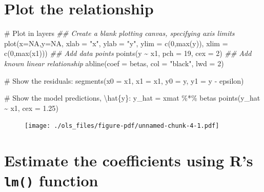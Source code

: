 \documentclass[
  letterpaper,
  DIV=11,
  numbers=noendperiod]{scrreprt}
\newenvironment{Shaded}{\begin{snugshade}}{\end{snugshade}}
\newcommand{\AttributeTok}[1]{\textcolor[rgb]{0.40,0.45,0.13}{#1}}
\newcommand{\CommentTok}[1]{\textcolor[rgb]{0.37,0.37,0.37}{#1}}
\newcommand{\ConstantTok}[1]{\textcolor[rgb]{0.56,0.35,0.01}{#1}}
\newcommand{\DecValTok}[1]{\textcolor[rgb]{0.68,0.00,0.00}{#1}}
\newcommand{\DocumentationTok}[1]{\textcolor[rgb]{0.37,0.37,0.37}{\textit{#1}}}
\newcommand{\FloatTok}[1]{\textcolor[rgb]{0.68,0.00,0.00}{#1}}
\newcommand{\FunctionTok}[1]{\textcolor[rgb]{0.28,0.35,0.67}{#1}}
\newcommand{\NormalTok}[1]{\textcolor[rgb]{0.00,0.23,0.31}{#1}}
\newcommand{\OtherTok}[1]{\textcolor[rgb]{0.00,0.23,0.31}{#1}}
\newcommand{\SpecialCharTok}[1]{\textcolor[rgb]{0.37,0.37,0.37}{#1}}
\newcommand{\StringTok}[1]{\textcolor[rgb]{0.13,0.47,0.30}{#1}}
\begin{document}
\hypertarget{plot-the-relationship}{%
\section{Plot the relationship}\label{plot-the-relationship}}

\begin{Shaded}
\begin{Highlighting}[]
\CommentTok{\# Plot in layers}
\DocumentationTok{\#\# Create a blank plotting canvas, specifying axis limits}
\FunctionTok{plot}\NormalTok{(}\AttributeTok{x=}\ConstantTok{NA}\NormalTok{,}\AttributeTok{y=}\ConstantTok{NA}\NormalTok{, }\AttributeTok{xlab =} \StringTok{"x"}\NormalTok{, }\AttributeTok{ylab =} \StringTok{"y"}\NormalTok{,}
     \AttributeTok{ylim =} \FunctionTok{c}\NormalTok{(}\DecValTok{0}\NormalTok{,}\FunctionTok{max}\NormalTok{(y)), }\AttributeTok{xlim =} \FunctionTok{c}\NormalTok{(}\DecValTok{0}\NormalTok{,}\FunctionTok{max}\NormalTok{(x1)))}
\DocumentationTok{\#\# Add data points}
\FunctionTok{points}\NormalTok{(y }\SpecialCharTok{\textasciitilde{}}\NormalTok{ x1, }\AttributeTok{pch =} \DecValTok{19}\NormalTok{, }\AttributeTok{cex =} \DecValTok{2}\NormalTok{)}
\DocumentationTok{\#\# Add known linear relationship}
\FunctionTok{abline}\NormalTok{(}\AttributeTok{coef =}\NormalTok{ betas, }\AttributeTok{col =} \StringTok{"black"}\NormalTok{, }\AttributeTok{lwd =} \DecValTok{2}\NormalTok{)}

\CommentTok{\# Show the residuals:}
\FunctionTok{segments}\NormalTok{(}\AttributeTok{x0 =}\NormalTok{ x1, }\AttributeTok{x1 =}\NormalTok{ x1,}
         \AttributeTok{y0 =}\NormalTok{ y, }\AttributeTok{y1 =}\NormalTok{ y }\SpecialCharTok{{-}}\NormalTok{ epsilon)}

\CommentTok{\# Show the model predictions, \textbackslash{}hat\{y\}:}
\NormalTok{y\_hat }\OtherTok{=}\NormalTok{ xmat }\SpecialCharTok{\%*\%}\NormalTok{ betas}
\FunctionTok{points}\NormalTok{(y\_hat }\SpecialCharTok{\textasciitilde{}}\NormalTok{ x1, }\AttributeTok{cex =} \FloatTok{1.25}\NormalTok{)}
\end{Highlighting}
\end{Shaded}

\begin{figure}[H]

{\centering \texttt{[image: ./ols\_files/figure-pdf/unnamed-chunk-4-1.pdf]}

}

\end{figure}

\hypertarget{sec-lm-output}{%
\section{\texorpdfstring{Estimate the coefficients using R's
\texttt{lm()}
function}{Estimate the coefficients using R's lm() function}}\label{sec-lm-output}}
\end{document}

